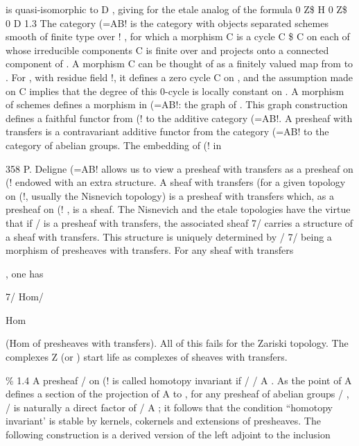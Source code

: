 \documentclass[11pt,a4paper]{article}
\theoremstyle{plain}
\theoremstyle{definition}
\begin{document}
is quasi-isomorphic to D , giving for the etale analog of   the formula
0  Z\$ H 0  Z\$   0  D 
1.3 The category (=AB! is the category with objects separated schemes
smooth
of finite type over ! , for which a morphism C 
 is a cycle C  \$ C on
   each of whose irreducible components C is finite over  and projects onto
a connected component of  . A morphism C can be thought of as a finitely valued
map from  to  . For    , with residue field !, it defines a zero cycle C
on   , and the assumption made on C implies that the degree of this 0-cycle is
locally constant on  .
A morphism of schemes  
 defines a morphism in (=AB!: the
graph of  . This graph construction defines a faithful functor from (! to the
additive category (=AB!.
A presheaf with transfers is a contravariant additive functor from the category (=AB! to the category of abelian groups. The embedding of (! in

358
P. Deligne
(=AB! allows us to view a presheaf with transfers as a presheaf on (!
endowed with an extra structure. A sheaf with transfers (for a given topology on
(!, usually the Nisnevich topology) is a presheaf with transfers which, as a
presheaf on (! , is a sheaf. The Nisnevich and the etale topologies have the virtue
that if / is a presheaf with transfers, the associated sheaf 7/  carries a structure of
a sheaf with transfers. This structure is uniquely determined by /
7/  being a
morphism of presheaves with transfers. For any sheaf with transfers

, one has

7/    Hom/ 

Hom

(Hom of presheaves with transfers). All of this fails for the Zariski topology.
The complexes Z
(or
) start life as complexes of sheaves with transfers.

 \%
1.4 A presheaf / on (! is called homotopy invariant if / /  A . As
the point  of A defines a section of the projection of   A to  , for any presheaf
of abelian groups / , / is naturally a direct factor of /  A ; it follows that
the condition ``homotopy invariant' is stable by kernels, cokernels and extensions of
presheaves. The following construction is a derived version of the left adjoint to the
inclusion
\end{document}
